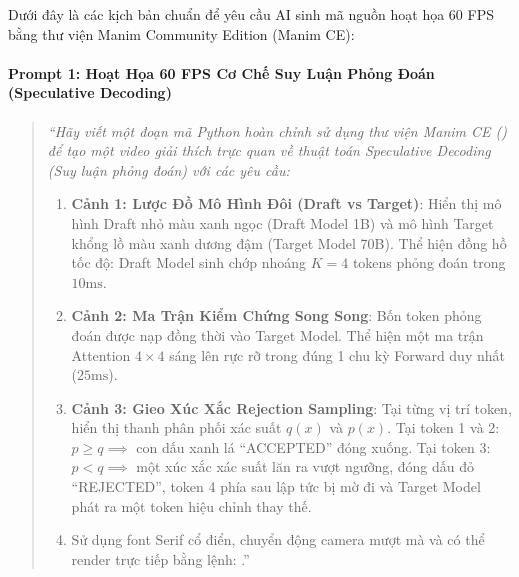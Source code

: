 \begin{simulationbox}
Dưới đây là các kịch bản chuẩn để yêu cầu AI sinh mã nguồn hoạt họa 60 FPS bằng thư viện Manim Community Edition (Manim CE):

\paragraph{Prompt 1: Hoạt Họa 60 FPS Cơ Chế Suy Luận Phỏng Đoán (Speculative Decoding)}
\begin{quote}\small\itshape
``Hãy viết một đoạn mã Python hoàn chỉnh sử dụng thư viện Manim CE () để tạo một video giải thích trực quan về thuật toán Speculative Decoding (Suy luận phỏng đoán) với các yêu cầu:
\begin{enumerate}
  \item \textbf{Cảnh 1: Lược Đồ Mô Hình Đôi (Draft vs Target)}: Hiển thị mô hình Draft nhỏ màu xanh ngọc (Draft Model 1B) và mô hình Target khổng lồ màu xanh dương đậm (Target Model 70B). Thể hiện đồng hồ tốc độ: Draft Model sinh chớp nhoáng $K=4$ tokens phỏng đoán trong $10\text{ms}$.
  \item \textbf{Cảnh 2: Ma Trận Kiểm Chứng Song Song}: Bốn token phỏng đoán được nạp đồng thời vào Target Model. Thể hiện một ma trận Attention $4 \times 4$ sáng lên rực rỡ trong đúng 1 chu kỳ Forward duy nhất ($25\text{ms}$).
  \item \textbf{Cảnh 3: Gieo Xúc Xắc Rejection Sampling}: Tại từng vị trí token, hiển thị thanh phân phối xác suất $q(x)$ và $p(x)$. Tại token 1 và 2: $p \ge q \implies$ con dấu xanh lá ``ACCEPTED'' đóng xuống. Tại token 3: $p < q \implies$ một xúc xắc xác suất lăn ra vượt ngưỡng, đóng dấu đỏ ``REJECTED'', token 4 phía sau lập tức bị mờ đi và Target Model phát ra một token hiệu chỉnh thay thế.
  \item Sử dụng font Serif cổ điển, chuyển động camera mượt mà và có thể render trực tiếp bằng lệnh: .''
\end{enumerate}
\end{quote}


\end{simulationbox}
